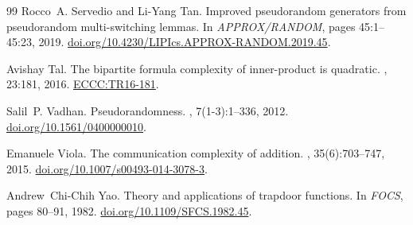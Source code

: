 \documentclass[10pt,a4paper]{article}
\begin{document}
\begin{thebibliography}{99}
Rocco~A. Servedio and Li-Yang Tan.
\newblock Improved pseudorandom generators from pseudorandom multi-switching
  lemmas.
\newblock In {\em {APPROX/RANDOM}}, pages 45:1--45:23, 2019.
\newblock
  \href{https://doi.org/10.4230/LIPIcs.APPROX-RANDOM.2019.45}{doi.org/10.4230/LIPIcs.APPROX-RANDOM.2019.45}.

Avishay Tal.
\newblock The bipartite formula complexity of inner-product is quadratic.
,
  23:181, 2016.
\newblock \href{http://eccc.hpi-web.de/report/2016/181}{ECCC:TR16-181}.

Salil~P. Vadhan.
\newblock Pseudorandomness.
,
  7(1-3):1--336, 2012.
\newblock
  \href{https://doi.org/10.1561/0400000010}{doi.org/10.1561/0400000010}.

Emanuele Viola.
\newblock The communication complexity of addition.
, 35(6):703--747, 2015.
\newblock
  \href{https://doi.org/10.1145/10.1007/s00493-014-3078-3}{doi.org/10.1007/s00493-014-3078-3}.

Andrew~Chi{-}Chih Yao.
\newblock Theory and applications of trapdoor functions.
\newblock In {\em {FOCS}}, pages 80--91, 1982.
\newblock
  \href{https://doi.org/10.1109/SFCS.1982.45}{doi.org/10.1109/SFCS.1982.45}.

\end{thebibliography}
\end{document}
